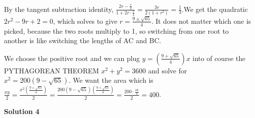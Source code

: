 \begin{enumerate}
 By the tangent subtraction identity, $\frac{2r-\frac{r}{2}}{1+2r \cdot \frac{r}{2}}=\frac{3r}{2(1+r^2)}=\frac{1}{3}$.We get the quadratic $2r^2 -9r+2=0$, which solves to give $r=\frac{9 \pm \sqrt{65}}{4}$. It does not matter which one is picked, because the two roots multiply to 1, so switching from one root to another is like switching the lengths of AC and BC.

 We choose the positive root and we can plug $y= \left (\frac{9 + \sqrt{65}}{4} \right )x$ into of course the PYTHAGOREAN THEOREM $x^2 + y^2 =3600$ and solve for $x^2=200(9-\sqrt{65})$. We want the area which is $\frac{xy}{2}=\frac{x^2(\frac{9 + \sqrt{65}}{4})}{2}=\frac{200(9-\sqrt{65})(\frac{9 + \sqrt{65}}{4})}{2}=\frac{200\cdot\frac{16}{4}}{2}=400$.

 



\textbf{Solution 4}


\end{enumerate}
